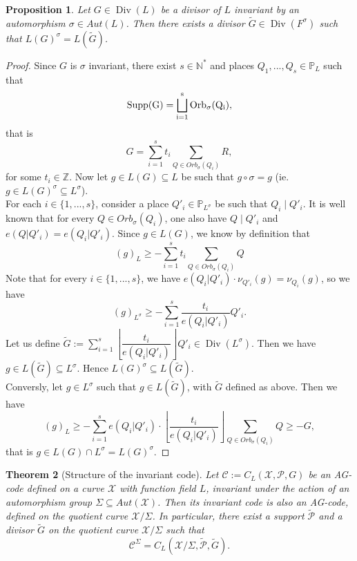 \documentclass[10pt]{article}
\newtheorem{thm}{Theorem}
\newtheorem{prop1}[thm]{Proposition}
\newcommand{\s}{\vspace{0.3cm}}
\newcommand{\cd}{\cdot}
\newcommand{\N}{\mathbb{N}}
\newcommand{\Z}{\mathbb{Z}}
\newcommand{\PP}{\mathbb{P}}
\newcommand{\su}{\subseteq}
\newcommand{\X}{\mathcal{X}}
\newcommand{\PR}{\mathcal{P}}
\newcommand{\Div}{\operatorname{Div}}
\begin{document}
\s

\begin{prop1} \label{invrr}
Let $G \in \Div(L)$ be a divisor of $L$ invariant by an automorphism $\sigma \in Aut(L)$. Then there exists a divisor $\tilde{G} \in \Div(F^{\sigma})$ such that $L(G)^{\sigma} = L(\tilde{G})$.
\end{prop1}

\s

\begin{proof}
Since $G$ is $\sigma$ invariant, there exist $s \in \N^*$ and places $Q_1,...,Q_s \in \PP_L$ such that 
\[\rm{Supp(G)} = \bigsqcup_{i=1}^s Orb_{\sigma}(Q_i),\]
that is 
\[G = \sum\limits_{i=1}^s t_i \sum\limits_{Q \in Orb_{\sigma}(Q_i)} R,\]
for some $t_i \in \Z$. Now let $g \in L(G) \su L$ be such that $g \circ \sigma = g$ (ie. $g \in L(G)^{\sigma} \su L^{\sigma}$). \\
For each $i \in \{1,...,s\}$, consider a place $Q'_i \in \PP_{L^{\sigma}}$ be such that $Q_i \mid Q'_i$. It is well known that for every $Q \in Orb_{\sigma}(Q_i)$, one also have $Q \mid Q'_i$ and $e(Q|Q'_i)=e(Q_i|Q'_i)$. Since $g \in L(G)$, we know by definition that
\[(g)_L \geq - \sum\limits_{i=1}^s t_i \sum\limits_{Q \in Orb_{\sigma}(Q_i)} Q\]
Note that for every $i \in \{1,...,s\}$, we have $e(Q_i|Q'_i) \cd \nu_{Q'_i}(g) = \nu_{Q_i}(g)$, so we have 
\[(g)_{L^{\sigma}} \geq - \sum\limits_{i=1}^s \dfrac{t_i}{e(Q_i|Q'_i)}  Q'_i.\]
Let us define $\tilde{G}:= \sum\limits_{i=1}^s \left\lfloor\dfrac{t_i}{e(Q_i|Q'_i)}\right\rfloor  Q'_i \in \Div(L^{\sigma})$. Then we have $g \in L(\tilde{G}) \su L^{\sigma}$. Hence $L(G)^{\sigma} \su L(\tilde{G})$. \\
Conversly, let $g \in L^{\sigma}$ such that $g \in L(\tilde{G})$, with $\tilde{G}$ defined as above. Then we have 
\[ (g)_L \geq -\sum\limits_{i=1}^s e(Q_i|Q'_i) \cd \left\lfloor\dfrac{t_i}{e(Q_i|Q'_i)}\right\rfloor \sum\limits_{Q \in Orb_{\sigma}(Q_i)} Q \geq -G,\]
that is $g \in L(G) \cap L^{\sigma} = L(G)^{\sigma}$.
\end{proof}

\s

\begin{thm} [Structure of the invariant code] \label{invstruct}
Let $\mathcal{C} := C_L(\X,\PR,G)$ be an AG-code defined on a curve $\X$ with function field $L$, invariant under the action of an automorphism group $\Sigma \su Aut(\X)$. Then its invariant code is also an AG-code, defined on the quotient curve $\X/\Sigma$. In particular, there exist a support $\tilde{\PR}$ and a divisor $\tilde{G}$ on the quotient curve $\X/\Sigma$ such that
\[\mathcal{C}^{\Sigma} = C_L(\X/\Sigma,\tilde{\PR},\tilde{G}).\]
\end{thm}
\end{document}
